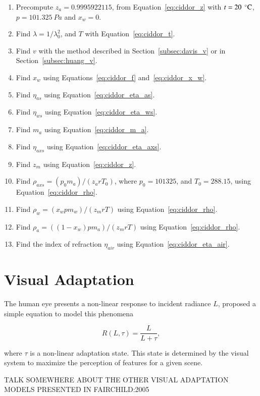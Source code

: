 \begin{enumerate}
\item Precompute $z_a = 0.9995922115$, from Equation~\ref{eq:ciddor_z} with $t = 20~\,^{\circ}{\rm C}$, $p = 101.325~Pa$ and $x_w=0$.
\item Find $\lambda = 1 / \lambda_0^2$, and $T$ with Equation~\ref{eq:ciddor_t}.
\item Find $v$ with the method described in Section~\ref{subsec:davis_v} or in Section~\ref{subsec:huang_v}.
\item Find $x_w$ using Equations~\ref{eq:ciddor_f} and~\ref{eq:ciddor_x_w}.
\item Find $\eta_{as}$ using Equation~\ref{eq:ciddor_eta_as}.
\item Find $\eta_{ws}$ using Equation~\ref{eq:ciddor_eta_ws}.
\item Find $m_a$ using Equation~\ref{eq:ciddor_m_a}.
\item Find $\eta_{axs}$ using Equation~\ref{eq:ciddor_eta_axs}.
\item Find $z_m$ using Equation~\ref{eq:ciddor_z}.
\item Find $\rho_{axs} = (p_0 m_a)/(z_a r T_0)$, where $p_0 = 101325$, and $T_0 = 288.15$, using Equation~\ref{eq:ciddor_rho}.
\item Find $\rho_{w} = (x_w p m_w)/(z_m r T)$ using Equation~\ref{eq:ciddor_rho}.
\item Find $\rho_{a} = ((1 - x_w) p m_a)/(z_m r T)$ using Equation~\ref{eq:ciddor_rho}.
\item Find the index of refraction $\eta_{air}$ using Equation~\ref{eq:ciddor_eta_air}.
\end{enumerate} 

\section{Visual Adaptation}
\label{sec:visual_adaptation}

The human eye presents a non-linear response to incident radiance $L$, \cite{Naka:1966} proposed a simple equation to model this phenomena

\begin{equation}
\label{eq:visual_adaptation}
R(L, \tau) = \frac{L}{L + \tau},
\end{equation}

where $\tau$ is a non-linear adaptation state.
This state is determined by the visual system to maximize the perception of features for a given scene.

TALK SOMEWHERE ABOUT THE OTHER VISUAL ADAPTATION MODELS PRESENTED IN FAIRCHILD:2005
